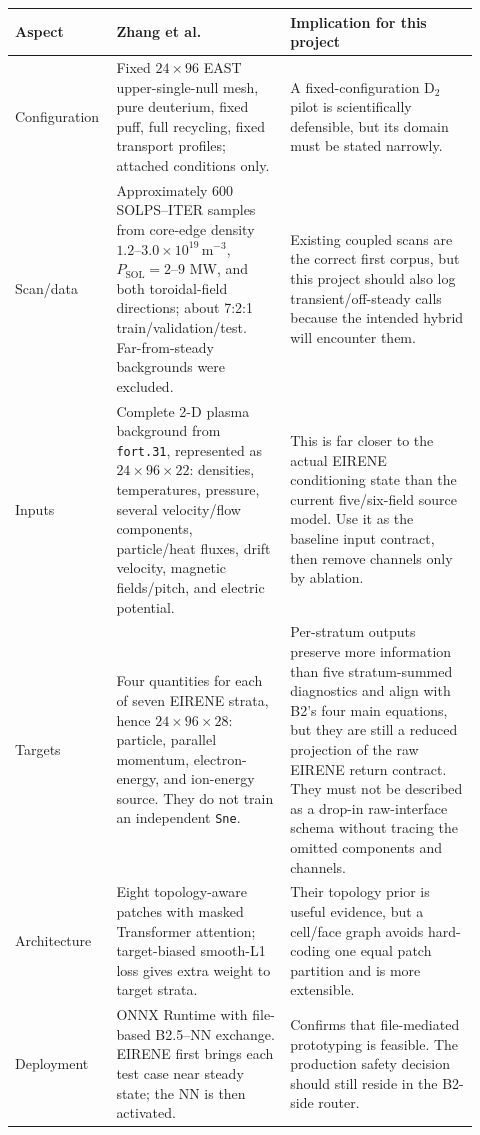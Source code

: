 \documentclass[11pt]{article}
\begin{document}
\begin{longtable}{@{}p{0.17\linewidth}p{0.36\linewidth}p{0.39\linewidth}@{}}
\toprule
Aspect & Zhang et al. & Implication for this project \\
\midrule
\endhead
Configuration & Fixed $24\times96$ EAST upper-single-null mesh, pure deuterium, fixed puff, full recycling, fixed transport profiles; attached conditions only. & A fixed-configuration D$_2$ pilot is scientifically defensible, but its domain must be stated narrowly. \\
Scan/data & Approximately 600 SOLPS--ITER samples from core-edge density $1.2$--$3.0\times10^{19}\,\mathrm{m^{-3}}$, $P_{\mathrm{SOL}}=2$--$9$ MW, and both toroidal-field directions; about 7:2:1 train/validation/test. Far-from-steady backgrounds were excluded. & Existing coupled scans are the correct first corpus, but this project should also log transient/off-steady calls because the intended hybrid will encounter them. \\
Inputs & Complete 2-D plasma background from \texttt{fort.31}, represented as $24\times96\times22$: densities, temperatures, pressure, several velocity/flow components, particle/heat fluxes, drift velocity, magnetic fields/pitch, and electric potential. & This is far closer to the actual EIRENE conditioning state than the current five/six-field source model. Use it as the baseline input contract, then remove channels only by ablation. \\
Targets & Four quantities for each of seven EIRENE strata, hence $24\times96\times28$: particle, parallel momentum, electron-energy, and ion-energy source. They do not train an independent \texttt{Sne}. & Per-stratum outputs preserve more information than five stratum-summed diagnostics and align with B2's four main equations, but they are still a reduced projection of the raw EIRENE return contract. They must not be described as a drop-in raw-interface schema without tracing the omitted components and channels. \\
Architecture & Eight topology-aware patches with masked Transformer attention; target-biased smooth-L1 loss gives extra weight to target strata. & Their topology prior is useful evidence, but a cell/face graph avoids hard-coding one equal patch partition and is more extensible. \\
Deployment & ONNX Runtime with file-based B2.5--NN exchange. EIRENE first brings each test case near steady state; the NN is then activated. & Confirms that file-mediated prototyping is feasible. The production safety decision should still reside in the B2-side router. \\
\bottomrule
\end{longtable}
\end{document}
